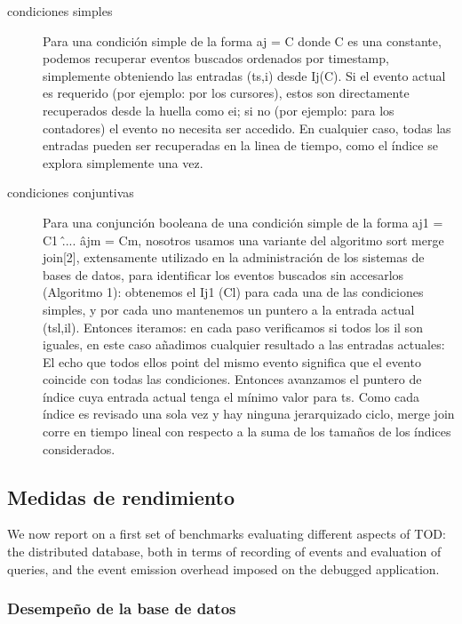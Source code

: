 \documentclass[12pt,legalpaper]{report}
\begin{document}
\begin{description}
	\item[condiciones simples] Para una condición simple de la forma aj = C donde C es una constante, podemos recuperar eventos buscados ordenados por timestamp, simplemente obteniendo las entradas (ts,i) desde Ij(C).  Si el evento actual es requerido (por ejemplo: por los cursores), estos son directamente recuperados desde la huella como ei; si no (por ejemplo: para los contadores) el evento no necesita ser accedido.  En cualquier caso, todas las entradas pueden ser recuperadas en la linea de tiempo, como el índice se explora simplemente una vez.

	\item[condiciones conjuntivas] Para una conjunción booleana de una condición simple de la forma aj1 = C1 \^ .... \^ ajm = Cm, nosotros usamos una variante del algoritmo sort merge join[2], extensamente utilizado en la administración de los sistemas de bases de datos, para identificar los eventos buscados sin accesarlos (Algoritmo 1):  obtenemos el Ij1 (Cl) para cada una de las condiciones simples, y por cada uno mantenemos un puntero a la entrada actual (tsl,il).  Entonces iteramos: en cada paso verificamos si todos los il son iguales, en este caso añadimos cualquier resultado a las entradas actuales:  El echo que todos ellos point del mismo evento significa que el evento coincide con todas las condiciones.  Entonces avanzamos el puntero de índice cuya entrada actual tenga el mínimo valor para ts.  Como cada índice es revisado una sola vez y hay ninguna jerarquizado ciclo, merge join corre en tiempo lineal con respecto a la suma de los tamaños de los índices considerados.
\end{description}

		\subsection{Medidas de rendimiento}

We now report on a first set of benchmarks evaluating different aspects of TOD: the distributed database, both in terms of recording of events and evaluation of queries, and the event emission overhead imposed on the debugged application.

			\subsubsection{Desempeño de la base de datos}
\end{document}
